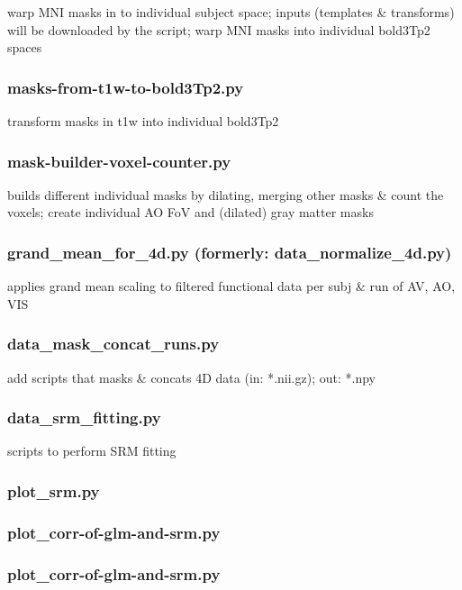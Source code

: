 warp MNI masks in to individual subject space; inputs (templates \& transforms)
will be downloaded by the script; warp MNI masks into individual bold3Tp2 spaces


\subsubsection{masks-from-t1w-to-bold3Tp2.py}
%
transform masks in t1w into individual bold3Tp2


\subsubsection{mask-builder-voxel-counter.py}

builds different individual masks by dilating, merging other masks \& count the
voxels; create individual AO FoV and (dilated) gray matter masks


\subsubsection{grand\_mean\_for\_4d.py (formerly: data\_normalize\_4d.py)}

applies grand mean scaling to filtered functional data per subj \& run of AV,
AO, VIS


\subsubsection{data\_mask\_concat\_runs.py}

add scripts that masks \& concats 4D data (in: *.nii.gz); out: *.npy


\subsubsection{data\_srm\_fitting.py}
%
scripts to perform SRM fitting


\subsubsection{plot\_srm.py}


\subsubsection{plot\_corr-of-glm-and-srm.py}


\subsubsection{plot\_corr-of-glm-and-srm.py}


